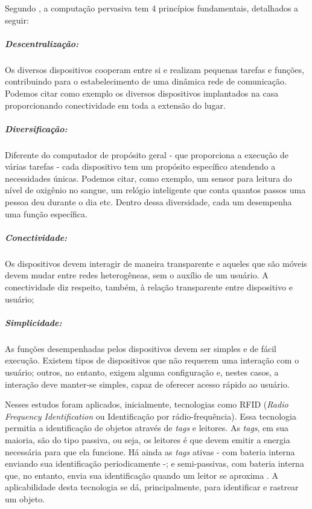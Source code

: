 Segundo , a computação pervasiva tem 4 princípios 
fundamentais, detalhados a seguir: 

\subparagraph{Descentralização:} 

Os diversos dispositivos cooperam entre si e realizam
pequenas tarefas e funções, contribuindo para o estabelecimento de uma 
dinâmica rede de comunicação. Podemos citar como exemplo os diversos 
dispositivos implantados na casa proporcionando conectividade em toda
a extensão do lugar.

\subparagraph{Diversificação:} 

Diferente do computador de propósito geral - que 
proporciona a execução de várias tarefas - cada dispositivo tem um propósito
específico atendendo a necessidades únicas. Podemos citar, como exemplo, um
sensor para leitura do nível de oxigênio no sangue, um relógio inteligente
que conta quantos passos uma pessoa deu durante o dia etc. Dentro dessa 
diversidade, cada um desempenha uma função específica.

\subparagraph{Conectividade:} 

Os dispositivos devem interagir de maneira transparente
e aqueles que são móveis devem mudar entre redes heterogêneas, sem o 
auxílio de um usuário. A conectividade diz respeito, também, à relação 
transparente entre dispositivo e usuário; 

\subparagraph{Simplicidade:} 

As funções desempenhadas pelos dispositivos devem ser
simples e de fácil execução. Existem tipos de dispositivos que não requerem 
uma interação com o usuário; outros, no entanto, exigem alguma configuração e,
nestes casos, a interação deve manter-se simples, capaz de oferecer acesso
rápido ao usuário. 

Nesses estudos foram aplicados, inicialmente, tecnologias como RFID
(\textit{Radio Frequency Identification} ou Identificação por
rádio-frequência).  Essa tecnologia permitia a identificação de objetos através
de \textit{tags} e leitores. As \textit{tags}, em sua maioria, são do tipo
passiva, ou seja, os leitores é que devem emitir a energia necessária para que
ela funcione. Há ainda as \textit{tags} ativas - com bateria interna enviando
sua identificação periodicamente -; e semi-passivas, com bateria interna que,
no entanto, envia sua identificação quando um leitor se aproxima
\cite{want2006introduction}. A aplicabilidade desta tecnologia se dá, 
principalmente, para identificar e rastrear um objeto.

